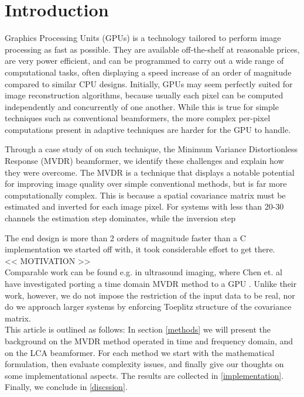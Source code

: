 \documentclass[
a4paper,10pt
]{ica2013_2}
\newcommand\1{\vec 1}
\begin{document}


\section{Introduction}

Graphics Processing Units (GPUs) is a technology tailored to perform image processing as fast as possible. They are available off-the-shelf at reasonable prices, are very power efficient, and can be programmed to carry out a wide range of computational tasks, often displaying a speed increase of an order of magnitude compared to similar CPU designs. Initially, GPUs may seem perfectly suited for image reconstruction algorithms, because usually each pixel can be computed independently and concurrently of one another. While this is true for simple techniques such as conventional beamformers, the more complex per-pixel computations present in adaptive techniques are harder for the GPU to handle.

Through a case study of on such technique, the Minimum Variance Distortionless Response (MVDR) beamformer, we identify these challenges and explain how they were overcome. The MVDR is a technique that displays a notable potential for improving image quality over simple conventional methods, but is far more computationally complex. This is because a spatial covariance matrix must be estimated and inverted for each image pixel. For systems with less than 20-30 channels the estimation step dominates, while the inversion step   %


The end design is more than 2 orders of magnitude faster than a C implementation we started off with, it took considerable effort to get there.
\\
<< MOTIVATION >>
\\
Comparable work can be found e.g. in ultrasound imaging, where Chen et. al have investigated porting a time domain MVDR method to a GPU \cite{Chen2009,Chen2011,Chen2011a}. Unlike their work, however, we do not impose the restriction of the input data to be real, nor do we approach larger systems by enforcing Toeplitz structure of the covariance matrix. 
\\
This article is outlined as follows: In section \ref{methods} we will present the background on the MVDR method operated in time and frequency domain, and on the LCA beamformer. For each method we start with the mathematical formulation, then evaluate complexity issues, and finally give our thoughts on some implementational aspects. The results are collected in \ref{implementation}. Finally, we conclude in \ref{discssion}.
\end{document}

